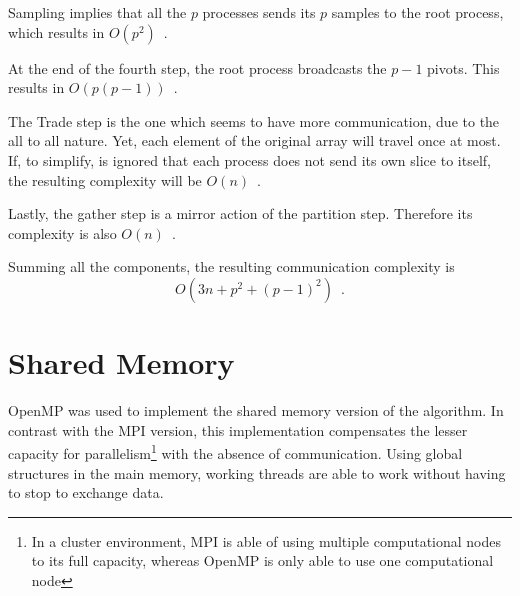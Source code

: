 \documentclass[abstract=on,9pt,twocolumn]{scrartcl}
\begin{document}
Sampling implies that all the $p$ processes sends its $p$ samples to the root process, which results in $O(p^{2})\enspace .$

At the end of the fourth step, the root process broadcasts the $p-1$ pivots. This results in $O(p(p-1))\enspace .$

The Trade step is the one which seems to have more communication, due to the all to all nature. Yet, each element of the original array will travel once at most. If, to simplify, is ignored that each process does not send its own slice to itself, the resulting complexity will be $O(n)\enspace .$

Lastly, the gather step is a mirror action of the partition step. Therefore its complexity is also $O(n)\enspace .$

Summing all the components, the resulting communication complexity is $$O(3n+p^{2}+(p-1)^{2})\enspace .$$












\section{Shared Memory}
\label{sec:omp}
OpenMP was used to implement the shared memory version of the algorithm. In contrast with the MPI version, this implementation compensates the lesser capacity for parallelism\footnote{In a cluster environment, MPI is able of using multiple computational nodes to its full capacity, whereas OpenMP is only able to use one computational node} with the absence of communication. Using global structures in the main memory, working threads are able to work without having to stop to exchange data.
\end{document}
